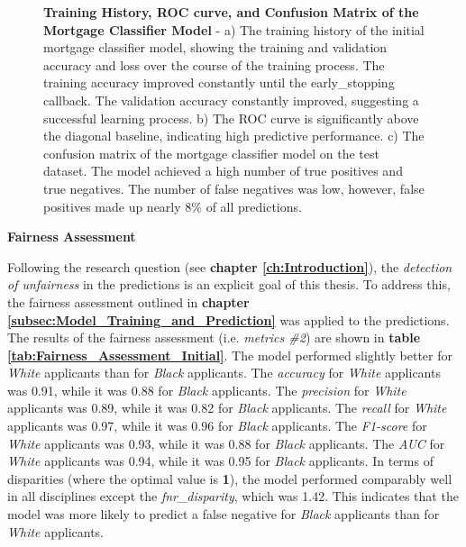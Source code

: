 \begin{figure}[!htbp]
    \caption[Training History, ROC curve, and Confusion Matrix of the Mortgage Classifier Model]{\textbf{Training History, ROC curve, and Confusion Matrix of the Mortgage Classifier Model} - a) The training history of the initial mortgage classifier model, showing the training and validation accuracy and loss over the course of the training process. 
    The training accuracy improved constantly until the early\_stopping callback. The validation accuracy constantly improved, suggesting a successful learning process.
    b) The ROC curve is significantly above the diagonal baseline, indicating high predictive performance. 
    c) The confusion matrix of the mortgage classifier model on the test dataset. The model achieved a high number of true positives and true negatives. The number of false negatives was low, however, false positives made up nearly 8\% of all predictions.}

    \label{fig:Model_Training_Results_Panel}

\end{figure}

\textbf{Fairness Assessment}

Following the research question (see \textbf{chapter \ref{ch:Introduction}}), the \textit{detection of unfairness} in the predictions is an explicit goal of this thesis. To address this, the fairness assessment outlined in \textbf{chapter \ref{subsec:Model_Training_and_Prediction}} was applied to the predictions. The results of the fairness assessment (i.e. \textit{metrics \#2}) are shown in \textbf{table \ref{tab:Fairness_Assessment_Initial}}. 
The model performed slightly better for \textit{White} applicants than for \textit{Black} applicants. The \textit{accuracy} for \textit{White} applicants was 0.91, while it was 0.88 for \textit{Black} applicants. The \textit{precision} for \textit{White} applicants was 0.89, while it was 0.82 for \textit{Black} applicants. The \textit{recall} for \textit{White} applicants was 0.97, while it was 0.96 for \textit{Black} applicants. 
The \textit{F1-score} for \textit{White} applicants was 0.93, while it was 0.88 for \textit{Black} applicants. The \textit{AUC} for \textit{White} applicants was 0.94, while it was 0.95 for \textit{Black} applicants. 
In terms of disparities (where the optimal value is \textbf{1}), the model performed comparably well in all disciplines except the \textit{fnr\_disparity}, which was 1.42. This indicates that the model was more likely to predict a false negative for \textit{Black} applicants than for \textit{White} applicants.

